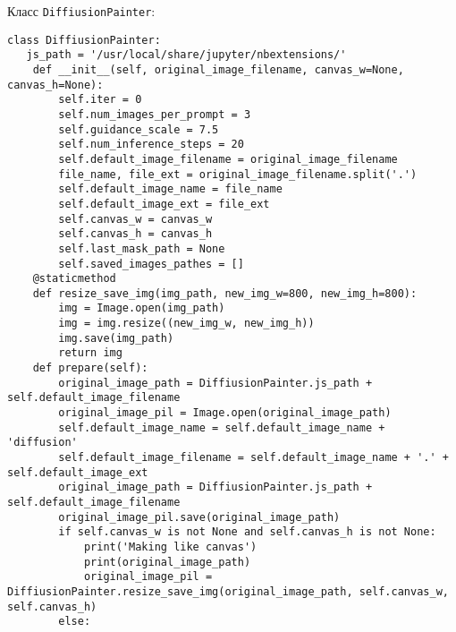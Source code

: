Класс \lstinline{DiffiusionPainter}:

\begin{lstlisting}[basicstyle=\ttfamily\small]
class DiffiusionPainter:
   js_path = '/usr/local/share/jupyter/nbextensions/'
    def __init__(self, original_image_filename, canvas_w=None, canvas_h=None):
        self.iter = 0
        self.num_images_per_prompt = 3
        self.guidance_scale = 7.5
        self.num_inference_steps = 20
        self.default_image_filename = original_image_filename
        file_name, file_ext = original_image_filename.split('.')
        self.default_image_name = file_name
        self.default_image_ext = file_ext
        self.canvas_w = canvas_w
        self.canvas_h = canvas_h
        self.last_mask_path = None
        self.saved_images_pathes = []
    @staticmethod
    def resize_save_img(img_path, new_img_w=800, new_img_h=800):
        img = Image.open(img_path)
        img = img.resize((new_img_w, new_img_h))
        img.save(img_path)
        return img
    def prepare(self):
        original_image_path = DiffiusionPainter.js_path + self.default_image_filename
        original_image_pil = Image.open(original_image_path)
        self.default_image_name = self.default_image_name + 'diffusion'
        self.default_image_filename = self.default_image_name + '.' + self.default_image_ext
        original_image_path = DiffiusionPainter.js_path + self.default_image_filename
        original_image_pil.save(original_image_path)
        if self.canvas_w is not None and self.canvas_h is not None:
            print('Making like canvas')
            print(original_image_path)
            original_image_pil = DiffiusionPainter.resize_save_img(original_image_path, self.canvas_w, self.canvas_h)
        else:
\end{lstlisting}
